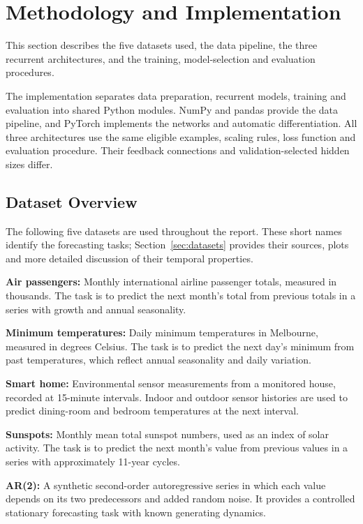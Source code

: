 \section{Methodology and Implementation}
\label{sec:methodology}

This section describes the five datasets used, the data pipeline, the three
recurrent architectures, and the training, model-selection and evaluation procedures.

The implementation separates data preparation, recurrent models, training and
evaluation into shared Python modules. NumPy and pandas provide the data
pipeline, and PyTorch implements the networks and automatic differentiation. All
three architectures use the same eligible examples, scaling rules, loss function
and evaluation procedure. Their feedback connections and validation-selected
hidden sizes differ.

\subsection{Dataset Overview}
The following five datasets are used throughout the report. These short names
identify the forecasting tasks; Section~\ref{sec:datasets} provides their sources,
plots and more detailed discussion of their temporal properties.


\noindent\textbf{Air passengers:} Monthly international airline passenger totals,
  measured in thousands. The task is to predict the next month's total from
  previous totals in a series with growth and annual seasonality.

\noindent\textbf{Minimum temperatures:} Daily minimum temperatures in Melbourne,
  measured in degrees Celsius. The task is to predict the next day's minimum
  from past temperatures, which reflect annual seasonality and daily variation.

\noindent\textbf{Smart home:} Environmental sensor measurements from a monitored house,
  recorded at 15-minute intervals. Indoor and outdoor sensor histories are used
  to predict dining-room and bedroom temperatures at the next interval.

\noindent\textbf{Sunspots:} Monthly mean total sunspot numbers, used as an index of solar
  activity. The task is to predict the next month's value from previous values
  in a series with approximately 11-year cycles.

\noindent\textbf{AR(2):} A synthetic second-order autoregressive series in which each
  value depends on its two predecessors and added random noise. It provides a
  controlled stationary forecasting task with known generating dynamics.

